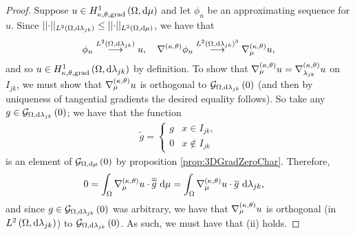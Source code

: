 \begin{proof}
	Suppose $u\in H^1_{\kappa,\theta,\mathrm{grad}}\left( \Omega, \mathrm{d}\mu \right)$ and let $\phi_n$ be an approximating sequence for $u$.
	Since $\lvert\lvert \cdot \rvert\rvert_{L^{2}\left( \Omega,\mathrm{d} \lambda_{jk} \right)} \leq \lvert\lvert \cdot \rvert\rvert_{L^{2}\left( \Omega,\mathrm{d} \mu \right)}$, we have that 
	\begin{align} \label{eq:3DTangGradProofApproxSequence}
		\phi_n\overset{L^{2}\left( \Omega,\mathrm{d} \lambda_{jk} \right)}{\longrightarrow} u, 
		\quad
		\nabla^{\left( \kappa, \theta \right)}\phi_n\overset{L^{2}\left( \Omega,\mathrm{d} \lambda_{jk} \right)^3}{\longrightarrow}\nabla^{\left( \kappa, \theta \right)}_{\mu}u,
	\end{align}
	and so $u\in H^1_{\kappa,\theta,\mathrm{grad}}\left( \Omega, \mathrm{d}\lambda_{jk} \right)$ by definition.
	To show that $\nabla^{\left( \kappa, \theta \right)}_{\mu}u = \nabla^{\left( \kappa, \theta \right)}_{\lambda_{jk}}u$ on $I_{jk}$, we must show that $\nabla^{\left( \kappa, \theta \right)}_{\mu}u$ is orthogonal to $\mathcal{G}_{ \Omega, \mathrm{d}\lambda_{jk}}\left( 0 \right)$ (and then by uniqueness of tangential gradients the desired equality follows).
	So take any $g\in\mathcal{G}_{ \Omega, \mathrm{d}\lambda_{jk}}\left( 0 \right)$; we have that the function
	\begin{align*}
		\widetilde{g} = \begin{cases} g & x\in I_{jk}, \\ 0 & x\not\in I_{jk} \end{cases}
	\end{align*}
	is an element of $\mathcal{G}_{ \Omega, \mathrm{d}\mu}\left( 0 \right)$ by proposition \ref{prop:3DGradZeroChar}.
	Therefore, 
	\begin{align*}
		0 &= \int_{\Omega} \nabla^{\left( \kappa, \theta \right)}_{\mu}u\cdot\overline{\widetilde{g}}  \ \mathrm{d}\mu
		= \int_{\Omega} \nabla^{\left( \kappa, \theta \right)}_{\mu}u\cdot\overline{g}  \ \mathrm{d}\lambda_{jk},
	\end{align*}
	and since $g\in\mathcal{G}_{ \Omega, \mathrm{d}\lambda_{jk}}\left( 0 \right)$ was arbitrary, we have that $\nabla^{\left( \kappa, \theta \right)}_{\mu}u$ is orthogonal (in $L^{2}\left( \Omega,\mathrm{d} \lambda_{jk} \right)$) to $\mathcal{G}_{ \Omega, \mathrm{d}\lambda_{jk}}\left( 0 \right)$.
	As such, we must have that (ii) holds.
	

\end{proof}
